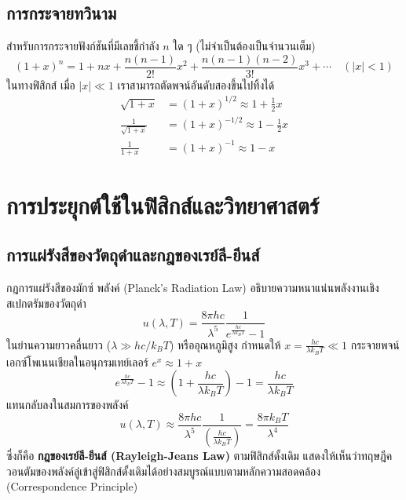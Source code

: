 \subsection{การกระจายทวินาม}
สำหรับการกระจายฟังก์ชันที่มีเลขชี้กำลัง $n$ ใด ๆ (ไม่จำเป็นต้องเป็นจำนวนเต็ม)
\begin{equation}
(1 + x)^n = 1 + nx + \frac{n(n-1)}{2!}x^2 + \frac{n(n-1)(n-2)}{3!}x^3 + \cdots \quad (|x| < 1)
\end{equation}
ในทางฟิสิกส์ เมื่อ $|x| \ll 1$ เราสามารถตัดพจน์อันดับสองขึ้นไปทิ้งได้
\begin{align}
\sqrt{1 + x} &= (1 + x)^{1/2} \approx 1 + \frac{1}{2}x \\
\frac{1}{\sqrt{1 + x}} &= (1 + x)^{-1/2} \approx 1 - \frac{1}{2}x \\
\frac{1}{1 + x} &= (1 + x)^{-1} \approx 1 - x
\end{align}

\section{การประยุกต์ใช้ในฟิสิกส์และวิทยาศาสตร์}
\subsection{การแผ่รังสีของวัตถุดำและกฎของเรย์ลี-ยีนส์}
กฎการแผ่รังสีของมักซ์ พลังค์ (Planck's Radiation Law) อธิบายความหนาแน่นพลังงานเชิงสเปกตรัมของวัตถุดำ
\begin{equation}
u(\lambda, T) = \frac{8\pi h c}{\lambda^5} \frac{1}{e^{\frac{hc}{\lambda k_B T}} - 1}
\end{equation}
ในย่านความยาวคลื่นยาว ($\lambda \gg hc/k_B T$) หรืออุณหภูมิสูง กำหนดให้ $x = \frac{hc}{\lambda k_B T} \ll 1$
กระจายพจน์เอกซ์โพเนนเชียลในอนุกรมเทย์เลอร์ $e^x \approx 1 + x$
\begin{equation}
e^{\frac{hc}{\lambda k_B T}} - 1 \approx \left(1 + \frac{hc}{\lambda k_B T}\right) - 1 = \frac{hc}{\lambda k_B T}
\end{equation}
แทนกลับลงในสมการของพลังค์
\begin{equation}
u(\lambda, T) \approx \frac{8\pi h c}{\lambda^5} \frac{1}{\left(\frac{hc}{\lambda k_B T}\right)} = \frac{8\pi k_B T}{\lambda^4}
\end{equation}
ซึ่งก็คือ \textbf{กฎของเรย์ลี-ยีนส์ (Rayleigh-Jeans Law)} ตามฟิสิกส์ดั้งเดิม แสดงให้เห็นว่าทฤษฎีควอนตัมของพลังค์ลู่เข้าสู่ฟิสิกส์ดั้งเดิมได้อย่างสมบูรณ์แบบตามหลักความสอดคล้อง (Correspondence Principle)

